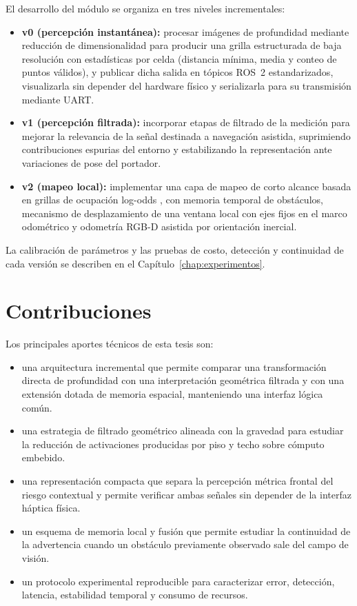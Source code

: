 El desarrollo del módulo se organiza en tres niveles incrementales:
\begin{itemize}
  \item \textbf{v0 (percepción instantánea):} procesar imágenes de profundidad mediante reducción
        de dimensionalidad para producir una grilla estructurada de baja resolución con
        estadísticas por celda (distancia mínima, media y conteo de puntos válidos), y publicar
        dicha salida en tópicos ROS~2 estandarizados, visualizarla sin depender del hardware físico
        y serializarla para su transmisión mediante UART.
  \item \textbf{v1 (percepción filtrada):} incorporar etapas de filtrado de la medición para
        mejorar la relevancia de la señal destinada a navegación asistida, suprimiendo
        contribuciones espurias del entorno y estabilizando la representación ante variaciones de
        pose del portador.
  \item \textbf{v2 (mapeo local):} implementar una capa de mapeo de corto alcance basada en
        grillas de ocupación log-odds \cite{Elfes1989, Thrun2005}, con memoria temporal de
        obstáculos, mecanismo de desplazamiento de una ventana local con ejes fijos en el marco
        odométrico y odometría RGB-D asistida por orientación inercial.
\end{itemize}

La calibración de parámetros y las pruebas de costo, detección y continuidad de cada versión
se describen en el Capítulo~\ref{chap:experimentos}.

\section{Contribuciones}

Los principales aportes técnicos de esta tesis son:

\begin{itemize}
  \item una arquitectura incremental que permite comparar una transformación directa de
        profundidad con una interpretación geométrica filtrada y con una extensión dotada de
        memoria espacial, manteniendo una interfaz lógica común.
  \item una estrategia de filtrado geométrico alineada con la gravedad para estudiar la reducción
        de activaciones producidas por piso y techo sobre cómputo embebido.
  \item una representación compacta que separa la percepción métrica frontal del riesgo contextual
        y permite verificar ambas señales sin depender de la interfaz háptica física.
  \item un esquema de memoria local y fusión que permite estudiar la continuidad de la advertencia cuando un
        obstáculo previamente observado sale del campo de visión.
  \item un protocolo experimental reproducible para caracterizar error, detección, latencia,
        estabilidad temporal y consumo de recursos.
\end{itemize}

